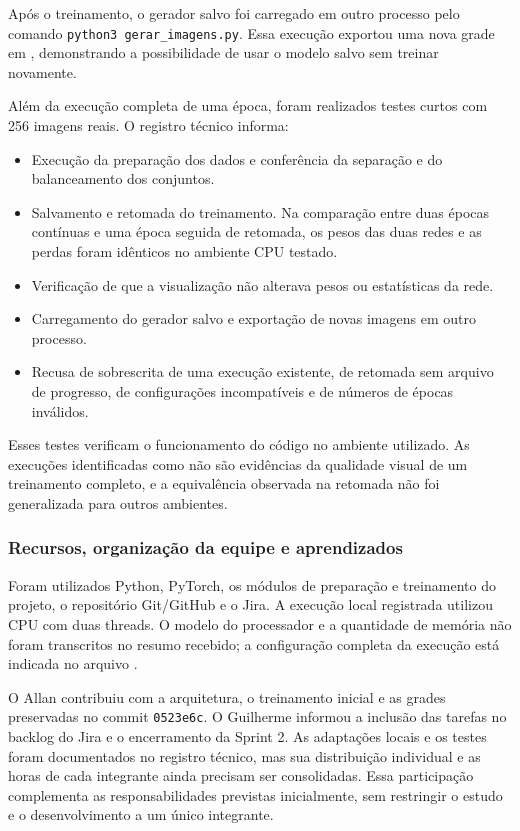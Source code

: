 \documentclass[12pt,a4paper]{article}
\begin{document}
Após o treinamento, o gerador salvo foi carregado em outro processo pelo comando \texttt{python3 gerar\_imagens.py}. Essa execução exportou uma nova grade em , demonstrando a possibilidade de usar o modelo salvo sem treinar novamente.

Além da execução completa de uma época, foram realizados testes curtos com 256 imagens reais. O registro técnico informa:
\begin{itemize}
\item Execução da preparação dos dados e conferência da separação e do balanceamento dos conjuntos.
\item Salvamento e retomada do treinamento. Na comparação entre duas épocas contínuas e uma época seguida de retomada, os pesos das duas redes e as perdas foram idênticos no ambiente CPU testado.
\item Verificação de que a visualização não alterava pesos ou estatísticas da rede.
\item Carregamento do gerador salvo e exportação de novas imagens em outro processo.
\item Recusa de sobrescrita de uma execução existente, de retomada sem arquivo de progresso, de configurações incompatíveis e de números de épocas inválidos.
\end{itemize}

Esses testes verificam o funcionamento do código no ambiente utilizado. As execuções identificadas como  não são evidências da qualidade visual de um treinamento completo, e a equivalência observada na retomada não foi generalizada para outros ambientes.

\subsubsection{Recursos, organização da equipe e aprendizados}
Foram utilizados Python, PyTorch, os módulos de preparação e treinamento do projeto, o repositório Git/GitHub e o Jira. A execução local registrada utilizou CPU com duas threads. O modelo do processador e a quantidade de memória não foram transcritos no resumo recebido; a configuração completa da execução está indicada no arquivo .

O Allan contribuiu com a arquitetura, o treinamento inicial e as grades preservadas no commit \texttt{0523e6c}. O Guilherme informou a inclusão das tarefas no backlog do Jira e o encerramento da Sprint 2. As adaptações locais e os testes foram documentados no registro técnico, mas sua distribuição individual e as horas de cada integrante ainda precisam ser consolidadas. Essa participação complementa as responsabilidades previstas inicialmente, sem restringir o estudo e o desenvolvimento a um único integrante.
\end{document}
